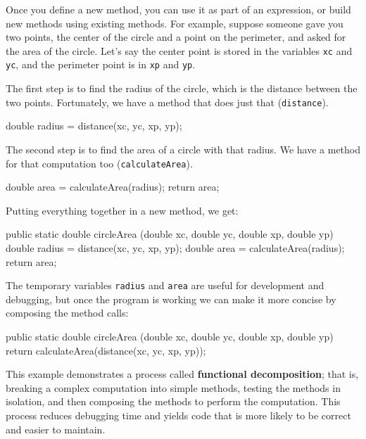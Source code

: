 \documentclass[12pt]{book}
\theoremstyle{exercise}
\newcommand{\java}[1]{\verb"#1"}
\begin{document}

Once you define a new method, you can use it as part of an expression, or build new methods using existing methods.
For example, suppose someone gave you two points, the center of the circle and a point on the perimeter, and asked for the area of the circle.
Let's say the center point is stored in the variables \java{xc} and \java{yc}, and the perimeter point is in \java{xp} and \java{yp}.

The first step is to find the radius of the circle, which is the distance between the two points.
Fortunately, we have a method that does just that (\java{distance}).

\begin{code}
    double radius = distance(xc, yc, xp, yp);
\end{code}

The second step is to find the area of a circle with that radius.
We have a method for that computation too (\java{calculateArea}).

\begin{code}
    double area = calculateArea(radius);
    return area;
\end{code}

Putting everything together in a new method, we get:

\begin{code}
    public static double circleArea
            (double xc, double yc, double xp, double yp) {
        double radius = distance(xc, yc, xp, yp);
        double area = calculateArea(radius);
        return area;
    }
\end{code}

The temporary variables \java{radius} and \java{area} are useful for development and debugging, but once the program is working we can make it more concise by composing the method calls:

\begin{code}
    public static double circleArea
            (double xc, double yc, double xp, double yp) {
        return calculateArea(distance(xc, yc, xp, yp));
    }
\end{code}

This example demonstrates a process called {\bf functional decomposition}; that is, breaking a complex computation into simple methods, testing the methods in isolation, and then composing the methods to perform the computation.
This process reduces debugging time and yields code that is more likely to be correct and easier to maintain.
\end{document}
